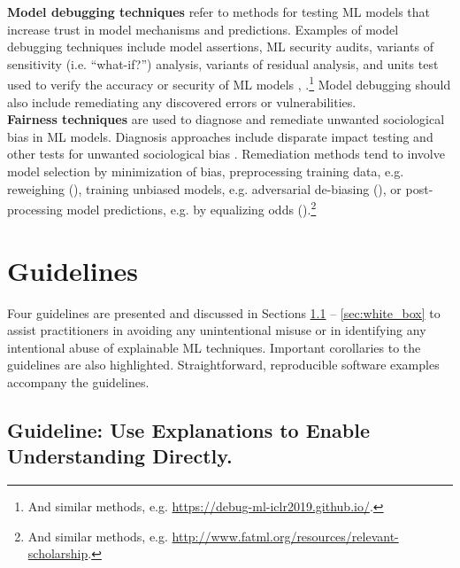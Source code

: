 \documentclass[sigconf]{acmart}
\begin{document}
\vspace{-8pt}
\noindent\textbf{Model debugging techniques} refer to methods for testing ML models that increase trust in model mechanisms and predictions. Examples of model debugging techniques include model assertions, ML security audits, variants of sensitivity (i.e. ``what-if?'') analysis, variants of residual analysis, and units test used to verify the accuracy or security of ML models \cite{modeltracker}, \cite{kangdebugging}.\footnote{And similar methods, e.g. \url{https://debug-ml-iclr2019.github.io/}.} Model debugging should also include remediating any discovered errors or vulnerabilities.\\

\vspace{-8pt}
\noindent\textbf{Fairness techniques} are used to diagnose and remediate unwanted sociological bias in ML models. Diagnosis approaches include disparate impact testing and other tests for unwanted sociological bias \cite{feldman2015certifying}. Remediation methods tend to involve model selection by minimization of bias, preprocessing training data, e.g. reweighing (\citet{kamiran2012data}), training unbiased models, e.g. adversarial de-biasing (\citet{zhang2018mitigating}), or post-processing model predictions, e.g. by equalizing odds (\citet{hardt2016equality}).\footnote{And similar methods, e.g. \url{http://www.fatml.org/resources/relevant-scholarship}.} 

\section{Guidelines}

Four guidelines are presented and discussed in Sections \ref{sec:trust} -- \ref{sec:white_box} to assist practitioners in avoiding any unintentional misuse or in identifying any intentional abuse of explainable ML techniques. Important corollaries to the guidelines are also highlighted. Straightforward, reproducible software examples accompany the guidelines. 

\subsection{Guideline: Use Explanations to Enable Understanding Directly.} \label{sec:trust}
\end{document}
